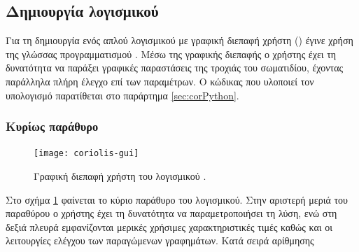 \subsection{Δημιουργία λογισμικού}
Για τη δημιουργία ενός απλού λογισμικού με γραφική διεπαφή χρήστη () έγινε χρήση της γλώσσας προγραμματισμού . Μέσω της γραφικής διεπαφής ο χρήστης έχει τη δυνατότητα να παράξει γραφικές παραστάσεις της τροχιάς του σωματιδίου, έχοντας παράλληλα πλήρη έλεγχο επί των παραμέτρων. Ο κώδικας που υλοποιεί τον υπολογισμό παρατίθεται στο παράρτημα \ref{sec:corPython}.
\subsubsection{Κυρίως παράθυρο}
\begin{figure}
\centering
\texttt{[image: coriolis-gui]}
\caption{Γραφική διεπαφή χρήστη του λογισμικού .}
\label{fig:coriolis-gui}
\end{figure}
Στο σχήμα \ref{fig:coriolis-gui} φαίνεται το κύριο παράθυρο του λογισμικού. Στην αριστερή μεριά του παραθύρου ο χρήστης έχει τη δυνατότητα να παραμετροποιήσει τη λύση, ενώ στη δεξιά πλευρά εμφανίζονται μερικές χρήσιμες χαρακτηριστικές τιμές καθώς και οι λειτουργίες ελέγχου των παραγώμενων γραφημάτων. Κατά σειρά αρίθμησης
